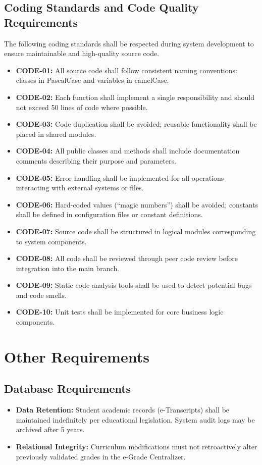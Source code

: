 \documentclass[11pt, a4paper]{article}
\begin{document}
\subsection{Coding Standards and Code Quality Requirements}
The following coding standards shall be respected during system development to ensure maintainable and high-quality source code.
\begin{itemize}
    \item \textbf{CODE-01:} All source code shall follow consistent naming conventions: classes in PascalCase and variables in camelCase.
    \item \textbf{CODE-02:} Each function shall implement a single responsibility and should not exceed 50 lines of code where possible.
    \item \textbf{CODE-03:} Code duplication shall be avoided; reusable functionality shall be placed in shared modules.
    \item \textbf{CODE-04:} All public classes and methods shall include documentation comments describing their purpose and parameters.
    \item \textbf{CODE-05:} Error handling shall be implemented for all operations interacting with external systems or files.
    \item \textbf{CODE-06:} Hard-coded values (``magic numbers'') shall be avoided; constants shall be defined in configuration files or constant definitions.
    \item \textbf{CODE-07:} Source code shall be structured in logical modules corresponding to system components.
    \item \textbf{CODE-08:} All code shall be reviewed through peer code review before integration into the main branch.
    \item \textbf{CODE-09:} Static code analysis tools shall be used to detect potential bugs and code smells.
    \item \textbf{CODE-10:} Unit tests shall be implemented for core business logic components.
\end{itemize}


\section{Other Requirements}

\subsection{Database Requirements}
\begin{itemize}
    \item \textbf{Data Retention:} Student academic records (e-Transcripts) shall be maintained indefinitely per educational legislation. System audit logs may be archived after 5 years.
    \item \textbf{Relational Integrity:} Curriculum modifications must not retroactively alter previously validated grades in the e-Grade Centralizer.
\end{itemize}
\end{document}

